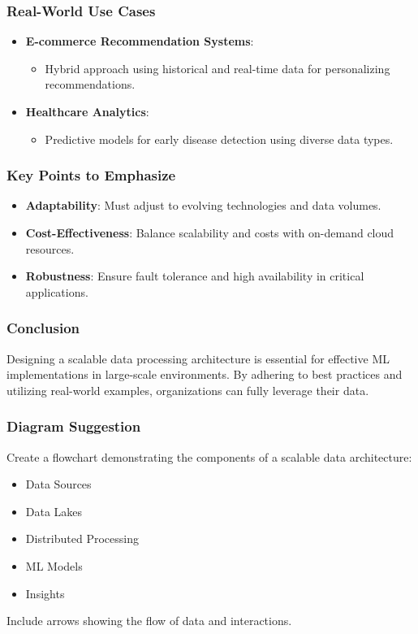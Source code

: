 \documentclass[aspectratio=169]{beamer}
\begin{document}
\begin{frame}
    \frametitle{Real-World Use Cases}
    \begin{itemize}
        \item \textbf{E-commerce Recommendation Systems}:
            \begin{itemize}
                \item Hybrid approach using historical and real-time data for personalizing recommendations.
            \end{itemize}
        \item \textbf{Healthcare Analytics}:
            \begin{itemize}
                \item Predictive models for early disease detection using diverse data types.
            \end{itemize}
    \end{itemize}
\end{frame}

\begin{frame}
    \frametitle{Key Points to Emphasize}
    \begin{itemize}
        \item \textbf{Adaptability}: Must adjust to evolving technologies and data volumes.
        \item \textbf{Cost-Effectiveness}: Balance scalability and costs with on-demand cloud resources.
        \item \textbf{Robustness}: Ensure fault tolerance and high availability in critical applications.
    \end{itemize}
\end{frame}

\begin{frame}
    \frametitle{Conclusion}
    Designing a scalable data processing architecture is essential for effective ML implementations in large-scale environments. By adhering to best practices and utilizing real-world examples, organizations can fully leverage their data.
\end{frame}

\begin{frame}
    \frametitle{Diagram Suggestion}
    Create a flowchart demonstrating the components of a scalable data architecture:
    \begin{itemize}
        \item Data Sources 
        \item Data Lakes 
        \item Distributed Processing 
        \item ML Models 
        \item Insights 
    \end{itemize}
    \smallskip
    Include arrows showing the flow of data and interactions.
\end{frame}
\end{document}
